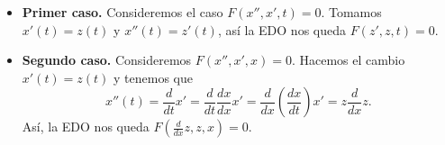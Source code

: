 \begin{itemize}
\item \textbf{Primer caso.} Consideremos el caso $\displaystyle F\left(x'', x', t\right)= 0 $. Tomamos $\displaystyle x'\left(t\right)=z\left(t\right) $ y $\displaystyle x''\left(t\right)=z'\left(t\right) $, así la EDO nos queda $\displaystyle F\left(z', z, t\right)= 0 $. 
\item \textbf{Segundo caso.} Consideremos $\displaystyle F\left(x'', x', x\right)= 0 $. Hacemos el cambio $\displaystyle x'\left(t\right)=z\left(t\right) $ y tenemos que 
	\[x''\left(t\right)=\frac{d}{dt}x' = \frac{d}{dt}\frac{dx}{dx}x' = \frac{d}{dx}\left(\frac{dx}{dt}\right)x'=z\frac{d}{dx}z .\]
Así, la EDO nos queda $\displaystyle F\left(\frac{d}{dx}z, z, x\right)= 0 $.
\end{itemize}

